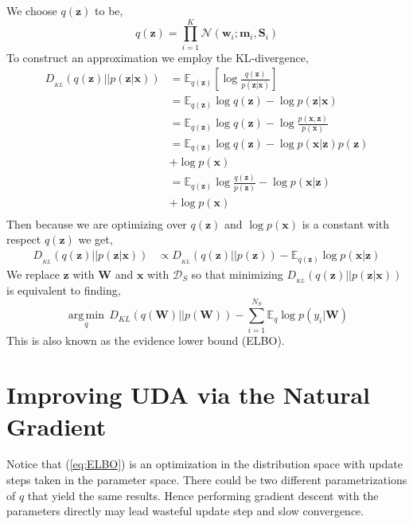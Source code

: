 \documentclass[10pt,twocolumn,letterpaper]{article}
\newcommand{\vect}[1]{\boldsymbol{\mathbf{#1}}}
\DeclareMathOperator*{\argmin}{arg\,min}
\begin{document}
We choose \(q(\vect{z})\) to be,
\[
q(\vect{z}) = \prod_{i=1}^{K} \mathcal{N}(\vect{w}_i ; \vect{m}_i, \vect{S}_i)
\]
To construct an approximation we employ the KL-divergence,
\begin{align*}
    D_{_{KL}}(q(\vect{z}) || p(\vect{z} | \vect{x})) &= \mathbb{E}_{q(\vect{z})} \left[ \log \frac{q(\vect{z})}{p(\vect{z} | \vect{x})} \right] \\
    &= \mathbb{E}_{q(\vect{z})} \log q(\vect{z}) - \log p(\vect{z} | \vect{x}) \\
    &= \mathbb{E}_{q(\vect{z})} \log q(\vect{z}) - \log \frac{p(\vect{x}, \vect{z})}{p(\vect{x})} \\
    &= \mathbb{E}_{q(\vect{z})} \log q(\vect{z}) - \log p(\vect{x}|\vect{z}) p(\vect{z}) \\
    &+ \log p(\vect{x})\\
    &= \mathbb{E}_{q(\vect{z})} \log \frac{q(\vect{z})}{p(\vect{z})} - \log p(\vect{x}|\vect{z}) \\
    &+ \log p(\vect{x}) \\
\end{align*}
Then because we are optimizing over \(q(\vect{z})\) and \(\log p(\vect{x})\) is a constant with respect \(q(\vect{z})\) we get,
\begin{align*}
D_{_{KL}}(q(\vect{z}) || p(\vect{z} | \vect{x}))
&\propto D_{_{KL}}(q(\vect{z}) || p(\vect{z})) - \mathbb{E}_{q(\vect{z})} \log p(\vect{x}|\vect{z})
\end{align*}
We replace \(\vect{z}\) with \(\vect{W}\) and \(\vect{x}\) with \(\mathcal{D}_S\) so that minimizing \(D_{_{KL}}(q(\vect{z}) || p(\vect{z} | \vect{x}))\) is equivalent to finding,
\begin{equation} \label{eq:ELBO}
    \underset{q}{\argmin} \, D_{KL} (q(\vect{W}) || p(\vect{W})) - \sum_{i=1}^{N_S} \mathbb{E}_{q} \log p(y_i|\vect{W})
\end{equation}
This is also known as the evidence lower bound (ELBO).

\section{Improving UDA via the Natural Gradient}
Notice that (\ref{eq:ELBO}) is an optimization in the distribution space with update steps taken in the parameter space. There could be two different parametrizations of \(q\) that yield the same results. Hence performing gradient descent with the parameters directly may lead wasteful update step and slow convergence.
\end{document}
